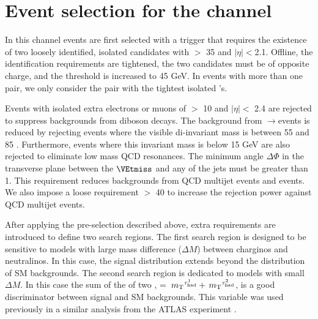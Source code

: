 \section{\texorpdfstring{Event selection for the \Tau\Tau channel}{Event selection for the tau-tau channel}}
\label{sect:tauTauCuts}
In this channel events are first selected with a trigger \cite{CMS:2013hoa,Chatrchyan:2012xi,Chatrchyan:2011nv}
that requires the existence of
two loosely identified, isolated \Tau candidates with \PT $>$ 35 \GeV and $|\eta|<$2.1.   Offline,
the \Tau identification requirements are tightened, the two \Tau candidates must be of
opposite charge, and the \PT threshold is increased to 45 GeV.
In events with more than one \Tau\Tau pair, we only consider the pair with the tightest isolated \Tau's. 

Events with isolated extra electrons or muons of \PT $>$ 10 \GeV and $|\eta| <$ 2.4 
are rejected to suppress %
backgrounds from diboson decays.
The background from \Z$\rightarrow$\Tau\Tau events is reduced by rejecting events where the visible
di-\Tau invariant mass is between 55 and 85 \GeV.  Furthermore, events where this invariant mass is below 15 GeV
are also rejected to eliminate low mass QCD resonances.
The minimum angle $\Delta \Phi$
in the transverse plane between the $\VEtmiss$ and any of the jets %
must be greater than 1.  This requirement reduces backgrounds from QCD multijet events and \wjets events.
We also impose a loose requirement \mttwo $>$ 40 \GeV to increase the rejection power against QCD multijet events.


After applying the pre-selection described above,
extra requirements are introduced to define two search regions.
The first search region is designed to be sensitive to models
with large mass difference ($\Delta M$) between charginos and neutralinos.
In this case, the \mttwo signal distribution extends beyond the 
distribution of SM backgrounds.
The second search region is dedicated to models with small $\Delta M$.  In this case
the sum of the \mt of two \Tau, \SumMT = $\,{m_{\rm T}}^{\tau_{\rm had}^1} + \,{m_{\rm T}}^{\tau_{\rm had}^2}$, is a good discriminator
between signal and SM backgrounds. 
This variable was used previously in a similar analysis from the ATLAS experiment \cite{Aad:2014yka}.


